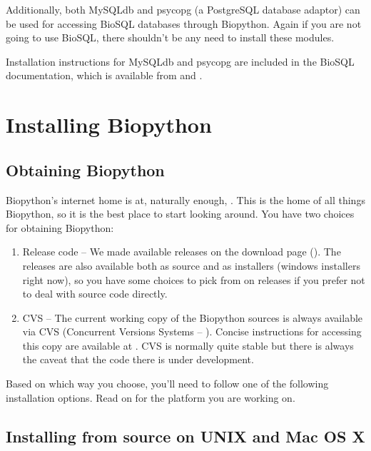 \documentclass{article}
\begin{document}
Additionally, both MySQLdb and psycopg (a PostgreSQL database adaptor)
can be used for accessing BioSQL databases through Biopython. Again if
you are not going to use BioSQL, there shouldn't be any need to install
these modules.


Installation instructions for MySQLdb and psycopg are included in the
BioSQL documentation, which is available from
 and
.

\section{Installing Biopython}

\subsection{Obtaining Biopython
}
Biopython's internet home is at, naturally enough,  
. This is the home of all things 
Biopython, so it is the best place to start looking around. 
You have two choices for obtaining Biopython:

\begin{enumerate}

\item Release code -- We made available releases on the download page 
(). 
The releases are also available both as source and as installers 
(windows installers right now), so you have some choices to pick from 
on releases if you prefer not to deal with source code directly.

\item CVS -- The current working copy of the Biopython sources is always
available via CVS (Concurrent Versions Systems --
). Concise instructions for
accessing this copy are available at
. CVS is normally quite stable
but there is always the caveat that the code there is under
development.

\end{enumerate}

Based on which way you choose, you'll need to follow one of the following installation options. Read on for the platform you are working on.

\subsection{Installing from source on UNIX and Mac OS X}
\label{sec:unix_install}
\end{document}
